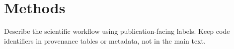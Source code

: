 \section{Methods}

Describe the scientific workflow using publication-facing labels. Keep code
identifiers in provenance tables or metadata, not in the main text.
